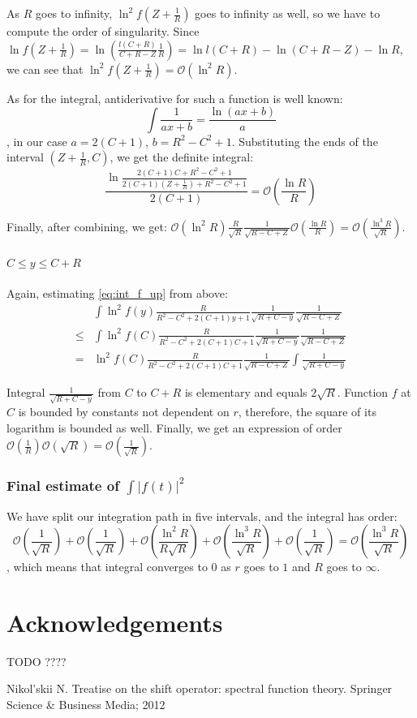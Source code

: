 \documentclass{gCOV2e}
\theoremstyle{plain}%
\theoremstyle{definition}
\theoremstyle{remark}
\begin{document}
As $R$ goes to infinity, $\ln^2 f(Z + \frac{1}{R})$ goes to infinity as well, so we have to compute the order of singularity. Since $\ln f(Z + \frac{1}{R}) = \ln \left( \frac{l(C + R)}{C + R - Z} \frac{1}{R} \right) = \ln l(C + R) - \ln (C + R - Z) - \ln R$, we can see that $\ln^2 f(Z + \frac{1}{R}) = \mathcal{O} (\ln^2 R)$.


As for the integral, antiderivative for such a function is well known:
\[
\int \frac{1}{a x + b} = \frac{\ln (a x + b)}{a}
\]
, in our case $a = 2 (C + 1)$, $b = R^2 - C^2 + 1$. Substituting the ends of the interval $(Z + \frac{1}{R}, C)$, we get the definite integral:
\[
\frac{\ln \frac{2 (C + 1) C + R^2 - C^2 + 1}{2 (C + 1) (Z + \frac{1}{R}) + R^2 - C^2 + 1}}{2 (C + 1)} = \mathcal{O}\left( \frac{\ln R}{R} \right)
\]


Finally, after combining, we get: $\mathcal{O} (\ln^2 R) \frac{R}{\sqrt{R}} \frac{1}{\sqrt{R - C + Z}} \mathcal{O}\left( \frac{\ln R}{R} \right)  = \mathcal{O}\left( \frac{\ln^3 R}{\sqrt{R}} \right)$.

\paragraph{$C \le y \le C + R$}

Again, estimating \ref{eq:int_f_up} from above:
\begin{align*}
       & \int \ln^2 f(y) \frac{R}{R^2 - C^2 + 2 (C + 1) y + 1} \frac{1}{\sqrt{R + C - y}} \frac{1}{\sqrt{R - C + Z}}
\\ \le & \int \ln^2 f(C) \frac{R}{R^2 - C^2 + 2 (C + 1) C + 1} \frac{1}{\sqrt{R + C - y}} \frac{1}{\sqrt{R - C + Z}}
\\ =   & \ln^2 f(C) \frac{R}{R^2 - C^2 + 2 (C + 1) C + 1} \frac{1}{\sqrt{R - C + Z}} \int \frac{1}{\sqrt{R + C - y}}
\end{align*}

Integral $\frac{1}{\sqrt{R + C - y}}$ from $C$ to $C + R$ is elementary and equals $2 \sqrt{R}$. Function $f$ at $C$ is bounded by constants not dependent on $r$, therefore, the square of its logarithm is bounded as well. Finally, we get an expression of order $\mathcal{O} \left( \frac{1}{R} \right) \mathcal{O}( \sqrt R ) = \mathcal{O} \left( \frac{1}{\sqrt{R}} \right)$.

\subsubsection{Final estimate of $\int \left|f(t)\right|^2$}
We have split our integration path in five intervals, and the integral has order:
\[
\mathcal{O} \left( \frac{1}{\sqrt{R}} \right) + \mathcal{O} \left( \frac{1}{\sqrt{R}} \right) +\mathcal{O}\left(\frac{\ln^2 R}{R \sqrt{R}}\right) + \mathcal{O}\left( \frac{\ln^3 R}{\sqrt{R}} \right) + \mathcal{O} \left( \frac{1}{\sqrt{R}} \right) = \mathcal{O}\left( \frac{\ln^3 R}{\sqrt{R}} \right)
\]
, which means that integral converges to $0$ as $r$ goes to $1$ and $R$ goes to $\infty$.

\section*{Acknowledgements}
TODO ????

\begin{thebibliography}{99}

Nikol'skii N. Treatise on the shift operator: spectral function theory. Springer Science \& Business Media; 2012

\end{thebibliography}
\end{document}
